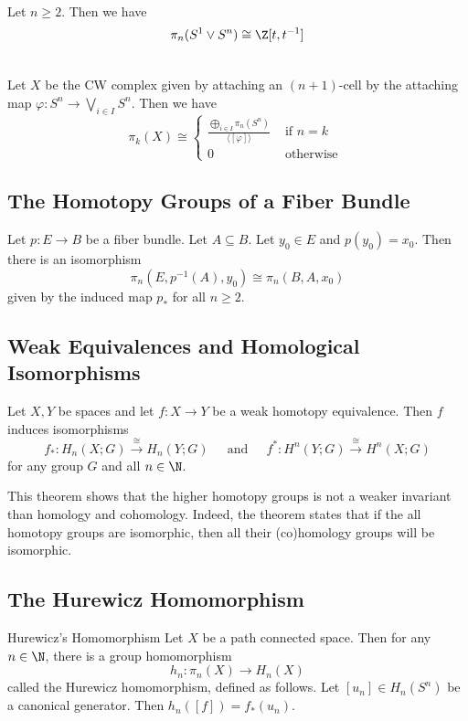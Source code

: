 \documentclass[a4paper]{article}
\begin{document}
\begin{eg}{}{}\\
Let $n\geq 2$. Then we have $$\pi_n(S^1\vee S^n)\cong\Z[t,t^{-1}]$$
\end{eg}

\begin{eg}{}{}\\
Let $X$ be the CW complex given by attaching an $(n+1)$-cell by the attaching map $\varphi:S^n\to\bigvee_{i\in I}S^n$. Then we have $$\pi_k(X)\cong\begin{cases}
\frac{\bigoplus_{i\in I}\pi_n(S^n)}{\langle[\varphi]\rangle} & \text{ if }n=k\\
0 & \text{ otherwise }
\end{cases}$$
\end{eg}

\subsection{The Homotopy Groups of a Fiber Bundle}
\begin{thm}{}{} Let $p:E\to B$ be a fiber bundle. Let $A\subseteq B$. Let $y_0\in E$ and $p(y_0)=x_0$. Then there is an isomorphism $$\pi_n(E,p^{-1}(A),y_0)\cong\pi_n(B,A,x_0)$$ given by the induced map $p_\ast$ for all $n\geq 2$. 
\end{thm}

\subsection{Weak Equivalences and Homological Isomorphisms}
\begin{prp}{}{} Let $X,Y$ be spaces and let $f:X\to Y$ be a weak homotopy equivalence. Then $f$ induces isomorphisms $$f_\ast:H_n(X;G)\overset{\cong}{\longrightarrow}H_n(Y;G)\;\;\;\;\text{ and }\;\;\;\;f^\ast:H^n(Y;G)\overset{\cong}{\longrightarrow}H^n(X;G)$$ for any group $G$ and all $n\in\N$. 
\end{prp}

This theorem shows that the higher homotopy groups is not a weaker invariant than homology and cohomology. Indeed, the theorem states that if the all homotopy groups are isomorphic, then all their (co)homology groups will be isomorphic. 


\subsection{The Hurewicz Homomorphism}
\begin{thm}{Hurewicz's Homomorphism}{} Let $X$ be a path connected space. Then for any $n\in\N$, there is a group homomorphism $$h_n:\pi_n(X)\to H_n(X)$$ called the Hurewicz homomorphism, defined as follows. Let $[u_n]\in H_n(S^n)$ be a canonical generator. Then $h_n([f])=f_\ast(u_n)$. 
\end{thm}
\end{document}
